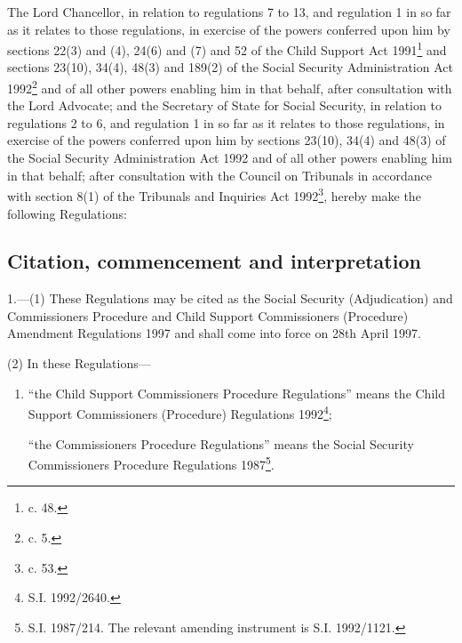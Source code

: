 \documentclass[12pt,a4paper]{article}
\title{\regstitle}
\author{S.I. 1997 No. 955}
\date{Made 18th March 1997\\Laid before Parliament 20th March 1997\\Coming into force 28th April 1997}
\begin{document}
\maketitle

\noindent
The Lord Chancellor, in relation to regulations 7 to 13, and regulation 1 in so far as it relates to those regulations, in exercise of the powers conferred upon him by sections 22(3) and (4), 24(6) and (7) and 52 of the Child Support Act 1991\footnote{ c. 48.} and sections 23(10), 34(4), 48(3) and 189(2) of the Social Security Administration Act 1992\footnote{ c. 5.} and of all other powers enabling him in that behalf, after consultation with the Lord Advocate; and the Secretary of State for Social Security, in relation to regulations 2 to 6, and regulation 1 in so far as it relates to those regulations, in exercise of the powers conferred upon him by sections 23(10), 34(4) and 48(3) of the Social Security Administration Act 1992 and of all other powers enabling him in that behalf; after consultation with the Council on Tribunals in accordance with section 8(1) of the Tribunals and Inquiries Act 1992\footnote{ c. 53.}, hereby make the following Regulations:

{\sloppy

\tableofcontents

}

\bigskip

\setcounter{secnumdepth}{-2}

\subsection[1. Citation, commencement and interpretation]{Citation, commencement and interpretation}

1.—(1) These Regulations may be cited as the Social Security (Adjudication) and Commissioners Procedure and Child Support Commissioners (Procedure) Amendment Regulations 1997 and shall come into force on 28th April 1997.

(2) In these Regulations—
\begin{enumerate}\item[]

“the Child Support Commissioners Procedure Regulations” means the Child Support Commissioners (Procedure) Regulations 1992\footnote{\frenchspacing S.I. 1992/2640.};

“the Commissioners Procedure Regulations” means the Social Security Commissioners Procedure Regulations 1987\footnote{\frenchspacing S.I. 1987/214. The relevant amending instrument is S.I. 1992/1121.}.
\end{enumerate}
\end{document}
